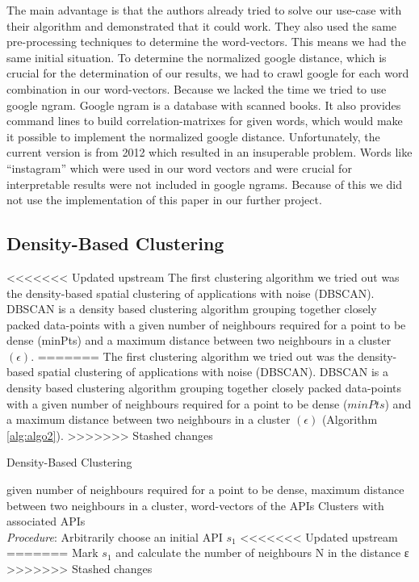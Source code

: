 \documentclass[a4paper]{IEEEtran}
\begin{document}
The main advantage is that the authors already tried to solve our use-case with their algorithm and demonstrated that it could work. They also used the same pre-processing techniques to determine the word-vectors. This means we had the same initial situation.
To determine the normalized google distance, which is crucial for the determination of our results, we had to crawl google for each word combination in our word-vectors. Because we lacked the time we tried to use google ngram. Google ngram is a database with scanned books. It also provides command lines to build correlation-matrixes for given words, which would make it possible to implement the normalized google distance. Unfortunately, the current version is from 2012 which resulted in an insuperable problem. Words like “instagram” which were used in our word vectors and were crucial for interpretable results were not included in google ngrams. Because of this we did not use the implementation of this paper in our further project.

\subsection{Density-Based Clustering}
<<<<<<< Updated upstream
The first clustering algorithm we tried out was the density-based spatial clustering of applications with noise (DBSCAN). DBSCAN\cite{kanungo2002efficient} is a density based clustering algorithm grouping together closely packed data-points with a given number of neighbours required for a point to be dense (minPts) and a maximum distance between two neighbours in a cluster $(\epsilon)$. 
=======
The first clustering algorithm we tried out was the density-based spatial clustering of applications with noise (DBSCAN). DBSCAN is a density based clustering algorithm grouping together closely packed data-points with a given number of neighbours required for a point to be dense ($minPts$) and a maximum distance between two neighbours in a cluster $(\epsilon)$ (Algorithm \ref{alg:algo2}). 
>>>>>>> Stashed changes

\begin{algorithm}[H]
 \caption{Density-Based Clustering}
 \label{alg:algo2}
 \begin{algorithmic}[1]
\renewcommand{\algorithmicrequire}{\textbf{Input:}}
 \renewcommand{\algorithmicensure}{\textbf{Output:}}
 \REQUIRE given number of neighbours required for a point to be dense, \newline maximum distance between two
neighbours in a cluster, \newline word-vectors of the APIs
 \ENSURE  Clusters with associated APIs
 \\ \textit{Procedure}:
  \STATE Arbitrarily choose an initial API $s_1$
<<<<<<< Updated upstream
 \STATE 
=======
 \STATE Mark $s_1$ and calculate the number of neighbours N in the distance ε
>>>>>>> Stashed changes
 \end{algorithmic}
 \end{algorithm}
\end{document}
